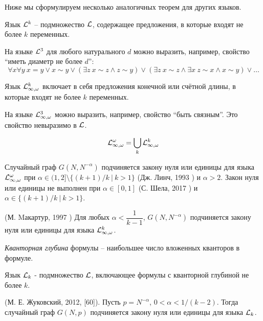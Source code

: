 Ниже мы сформулируем несколько аналогичных теорем для других языков.

\Def Язык $\mathcal{L}^k$ -- подмножество $\mathcal{L}$, содержащее предложения, в которые входят не более $k$ переменных.

На языке $\mathcal{L}^3$ для любого натурального $d$ можно выразить, например, свойство ``иметь диаметр не более $d$'': 
\[
\forall x \forall y ~ x = y \vee x \sim y \vee \left( \exists z ~ x\sim z \wedge z \sim y \right)
\vee  \left( \exists z ~ x\sim z \wedge \exists x ~ z \sim x \wedge x \sim y \right) \vee \ldots
\]

\Def Язык $\mathcal{L}^k_{\infty, \omega}$ включает в себя предложения конечной или счётной длины, в которые входят не более $k$ переменных.

На языке $\mathcal{L}^3_{\infty, \omega}$ можно выразить, например, свойство ``быть связным''.
Это свойство невыразимо в $\mathcal{L}$.

\Def \[\mathcal{L}^\omega_{\infty, \omega} = \bigcup_k \mathcal{L}^k_{\infty, \omega} \]

\begin{theorem}
Случайный граф $G(N, N^{-\alpha})$ подчиняется закону нуля или единицы для языка $\mathcal{L}^\omega_{\infty, \omega}$ при $\alpha \in (1,2] \setminus \{(k+1)/k ~|~ k > 1\}$ (Дж. Линч, 1993  \cite{lynch1993infinitary}) и $\alpha > 2$.
Закон нуля или единицы не выполнен при $\alpha \in [0,1]$ (С. Шела, 2017 \cite{shelah2017failure})  и $\alpha \in \{(k+1)/k ~|~ k > 1\}$.
\end{theorem}

\begin{theorem} (М. Mакартур, 1997 \cite{mcarthur1997asymptotic})
Для любых $\alpha < \dfrac{1}{k-1}$, $G(N, N^{-\alpha})$ подчиняется закону нуля или единицы для языка $\mathcal{L}^k_{\infty, \omega}$.
\end{theorem}

\Def \textit{Кванторная глубина} формулы -- наибольшее число вложенных кванторов в формуле.

\Def Язык $\mathcal{L}_k$ - подмножество $\mathcal{L}$, включающее формулы с кванторной глубиной не более $k$.

\begin{theorem}(М. Е. Жуковский, 2012, [60]). Пусть $p=N^{-\alpha}$, $0 < \alpha < 1/(k - 2)$. 
Тогда случайный граф $G(N, p)$ подчиняется закону нуля или единицы для языка $\mathcal{L}_k$.
\end{theorem}